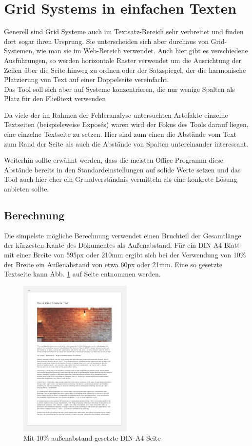 \section{Grid Systems in einfachen Texten}
Generell sind Grid Systeme auch im Textsatz-Bereich sehr verbreitet und finden dort sogar ihren Ursprung. Sie unterscheiden sich aber durchaus von Grid-Systemen, wie man sie im Web-Bereich verwendet. Auch hier gibt es verschiedene Ausführungen, so werden horizontale Raster verwendet um die Ausrichtung der Zeilen über die Seite hinweg zu ordnen oder der Satzspiegel, der die harmonische Platzierung von Text auf einer Doppelseite vereinfacht. \\
Das Tool soll sich aber auf Systeme konzentrieren, die nur wenige Spalten als Platz für den Fließtext verwenden

Da viele der im Rahmen der Fehleranalyse untersuchten Artefakte einzelne Textseiten (beispielsweise Exposés) waren wird der Fokus des Tools darauf liegen, eine einzelne Textseite zu setzen.
Hier sind zum einen die Abstände vom Text zum Rand der Seite als auch die Abstände von Spalten untereinander interessant.

Weiterhin sollte erwähnt werden, dass die meisten Office-Programm diese Abstände bereits in den Standardeinstellungen auf solide Werte setzen und das Tool auch hier eher ein Grundverständnis vermitteln als eine konkrete Lösung anbieten sollte.

\subsection{Berechnung}
Die simpelste mögliche Berechnung verwendet einen Bruchteil der Gesamtlänge der kürzesten Kante des Dokumentes als Außenabstand. Für ein DIN A4 Blatt mit einer Breite von 595px oder 210mm ergibt sich bei der Verwendung von 10\% der Breite ein Außenabstand von etwa 60px oder 21mm.
Eine so gesetzte Textseite kann Abb. \ref{fig:a4-single-col} auf Seite \pageref{fig:a4-single-col} entnommen werden.

\begin{figure}[h]
    \centering
    \includegraphics[width=0.5\textwidth]{images/A4-single-col.png}
    \caption{Mit 10\% außenabstand gesetzte DIN-A4 Seite}
    \label{fig:a4-single-col}
\end{figure}

